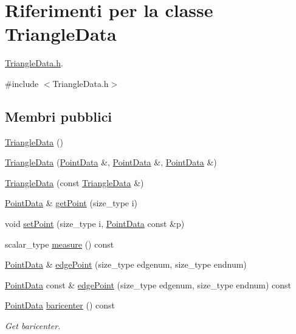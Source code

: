 \hypertarget{classTriangleData}{\section{Riferimenti per la classe Triangle\-Data}
\label{classTriangleData}
}


\hyperlink{TriangleData_8h}{Triangle\-Data.\-h}.  




{\ttfamily \#include $<$Triangle\-Data.\-h$>$}

\subsection*{Membri pubblici}
\begin{DoxyCompactItemize}
\item 
\hyperlink{classTriangleData_a51eec85cf2641bcdb7fbe596debf75e7}{Triangle\-Data} ()
\item 
\hyperlink{classTriangleData_a1a730b42b2fa2052689cad3cae0ee9f4}{Triangle\-Data} (\hyperlink{classPointData}{Point\-Data} \&, \hyperlink{classPointData}{Point\-Data} \&, \hyperlink{classPointData}{Point\-Data} \&)
\item 
\hyperlink{classTriangleData_ae628dd736844f1544b5e245588319d92}{Triangle\-Data} (const \hyperlink{classTriangleData}{Triangle\-Data} \&)
\item 
\hyperlink{classPointData}{Point\-Data} \& \hyperlink{classTriangleData_a88917dafcb5155d2359e5aeb4f8f36e2}{get\-Point} (size\-\_\-type i)
\item 
void \hyperlink{classTriangleData_a24c79732610361d5e11ee7ac2d577467}{set\-Point} (size\-\_\-type i, \hyperlink{classPointData}{Point\-Data} const \&p)
\item 
scalar\-\_\-type \hyperlink{classTriangleData_acbfbc62d5221ecd37437012fe8b68c8d}{measure} () const 
\item 
\hyperlink{classPointData}{Point\-Data} \& \hyperlink{classTriangleData_a6b8d98b054e9b094ba6b6ccf4217246b}{edge\-Point} (size\-\_\-type edgenum, size\-\_\-type endnum)
\item 
\hyperlink{classPointData}{Point\-Data} const \& \hyperlink{classTriangleData_a30665b2010f85d6b9223581e31e79308}{edge\-Point} (size\-\_\-type edgenum, size\-\_\-type endnum) const 
\item 
\hyperlink{classPointData}{Point\-Data} \hyperlink{classTriangleData_af52f48a6b75c258927b0b4ea29d4c383}{baricenter} () const 
\begin{DoxyCompactList}\small\item\em Get baricenter. \end{DoxyCompactList}\item 

\end{DoxyCompactItemize}
